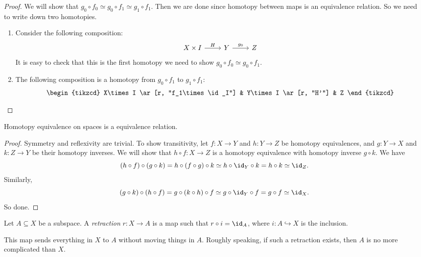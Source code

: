 \documentclass[a4paper]{article}
\begin{document}
\begin{proof}
  We will show that $g_0 \circ f_0 \simeq g_0 \circ f_1 \simeq g_1 \circ f_1$. Then we are done since homotopy between maps is an equivalence relation. So we need to write down two homotopies.

  \begin{enumerate}
    \item Consider the following composition:
      \[
        \begin{tikzcd}
          X\times I \ar[r, "H"] & Y \ar[r, "g_0"] & Z
        \end{tikzcd}
      \]
      It is easy to check that this is the first homotopy we need to show $g_0\circ f_0 \simeq g_0 \circ f_1$.
    \item The following composition is a homotopy from $g_0 \circ f_1$ to $g_1 \circ f_1$:
      \[
        \begin{tikzcd}
          X\times I \ar[r, "f_1\times \id_I"] & Y\times I \ar[r, "H'"] & Z
        \end{tikzcd}
      \]
  \end{enumerate}
\end{proof}

\begin{prop}
  Homotopy equivalence on spaces is a equivalence relation.
\end{prop}

\begin{proof}
  Symmetry and reflexivity are trivial. To show transitivity, let $f: X \to Y$ and $h: Y \to Z$ be homotopy equivalences, and $g: Y \to X$ and $k: Z \to Y$ be their homotopy inverses. We will show that $h \circ f: X \to Z$ is a homotopy equivalence with homotopy inverse $g \circ k$. We have
  \[
    (h \circ f) \circ (g \circ k) = h \circ (f \circ g) \circ k \simeq h \circ \id_Y \circ k = h \circ k \simeq \id_Z.
  \]
  Similarly,
  \[
    (g \circ k) \circ (h \circ f) = g \circ (k \circ h) \circ f \simeq g \circ \id_Y \circ f = g \circ f \simeq \id_X.
  \]
  So done.
\end{proof}

\begin{defi}[Retraction]
  Let $A\subseteq X$ be a subspace. A \emph{retraction} $r: X\to A$ is a map such that $r\circ i = \id_A$, where $i: A\hookrightarrow X$ is the inclusion.
\end{defi}
This map sends everything in $X$ to $A$ without moving things in $A$. Roughly speaking, if such a retraction exists, then $A$ is no more complicated than $X$.
\end{document}
